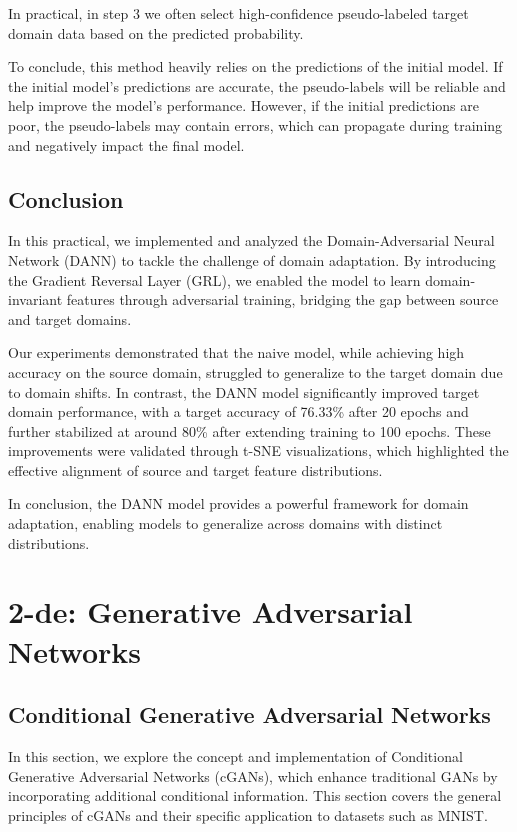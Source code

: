 \documentclass{rapportECL}
\begin{document}
\begin{description}
    In practical, in step 3 we often select high-confidence pseudo-labeled target domain data based on the predicted probability. 
    
    To conclude, this method heavily relies on the predictions of the initial model. If the initial model’s predictions are accurate, the pseudo-labels will be reliable and help improve the model's performance. However, if the initial predictions are poor, the pseudo-labels may contain errors, which can propagate during training and negatively impact the final model.

    

\end{description}

\section{Conclusion}
In this practical, we implemented and analyzed the Domain-Adversarial Neural Network (DANN) to tackle the challenge of domain adaptation. By introducing the Gradient Reversal Layer (GRL), we enabled the model to learn domain-invariant features through adversarial training, bridging the gap between source and target domains.

Our experiments demonstrated that the naive model, while achieving high accuracy on the source domain, struggled to generalize to the target domain due to domain shifts. In contrast, the DANN model significantly improved target domain performance, with a target accuracy of 76.33\% after 20 epochs and further stabilized at around 80\% after extending training to 100 epochs. These improvements were validated through t-SNE visualizations, which highlighted the effective alignment of source and target feature distributions.

In conclusion, the DANN model provides a powerful framework for domain adaptation, enabling models to generalize across domains with distinct distributions. 


\newpage
\chapter*{2-de: Generative Adversarial Networks}
\setcounter{section}{0}


\section{Conditional Generative Adversarial Networks}
In this section, we explore the concept and implementation of Conditional Generative Adversarial Networks (cGANs), which enhance traditional GANs by incorporating additional conditional information. This section covers the general principles of cGANs and their specific application to datasets such as MNIST.
\end{document}
